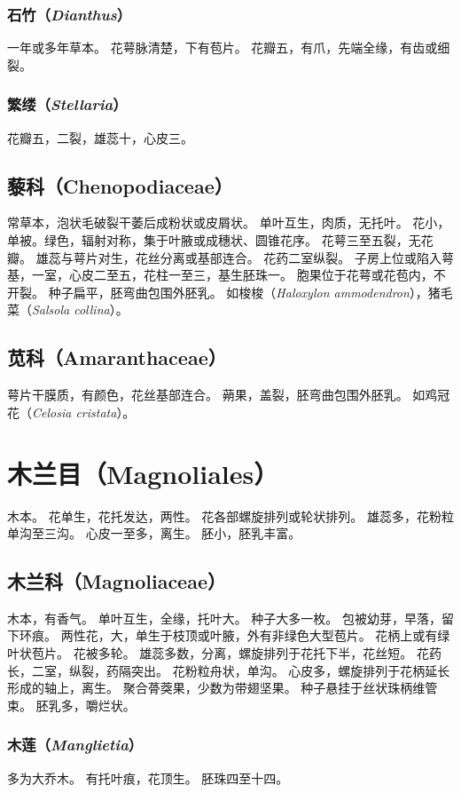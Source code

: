 \documentclass[11pt]{article}
\begin{document}
\begin{sloppypar}
\subsubsection{石竹（\textit{Dianthus}）}
一年或多年草本。
花萼脉清楚，下有苞片。
花瓣五，有爪，先端全缘，有齿或细裂。

\subsubsection{繁缕（\textit{Stellaria}）}
花瓣五，二裂，雄蕊十，心皮三。

\subsection{藜科（Chenopodiaceae）}
常草本，泡状毛破裂干萎后成粉状或皮屑状。
单叶互生，肉质，无托叶。
花小，单被。绿色，辐射对称，集于叶腋或成穗状、圆锥花序。
花萼三至五裂，无花瓣。
雄蕊与萼片对生，花丝分离或基部连合。
花药二室纵裂。
子房上位或陷入萼基，一室，心皮二至五，花柱一至三，基生胚珠一。
胞果位于花萼或花苞内，不开裂。
种子扁平，胚弯曲包围外胚乳。
如梭梭（\textit{Haloxylon ammodendron}），猪毛菜（\textit{Salsola collina}）。

\subsection{苋科（Amaranthaceae）}
萼片干膜质，有颜色，花丝基部连合。
蒴果，盖裂，胚弯曲包围外胚乳。
如鸡冠花（\textit{Celosia cristata}）。

\section{木兰目（Magnoliales）}
木本。
花单生，花托发达，两性。
花各部螺旋排列或轮状排列。
雄蕊多，花粉粒单沟至三沟。
心皮一至多，离生。
胚小，胚乳丰富。

\subsection{木兰科（Magnoliaceae）}
木本，有香气。
单叶互生，全缘，托叶大。
种子大多一枚。
包被幼芽，早落，留下环痕。
两性花，大，单生于枝顶或叶腋，外有非绿色大型苞片。
花柄上或有绿叶状苞片。
花被多轮。
雄蕊多数，分离，螺旋排列于花托下半，花丝短。
花药长，二室，纵裂，药隔突出。
花粉粒舟状，单沟。
心皮多，螺旋排列于花柄延长形成的轴上，离生。
聚合蓇葖果，少数为带翅坚果。
种子悬挂于丝状珠柄维管束。
胚乳多，嚼烂状。

\subsubsection{木莲（\textit{Manglietia}）}
多为大乔木。
有托叶痕，花顶生。
胚珠四至十四。


\end{sloppypar}
\end{document}

